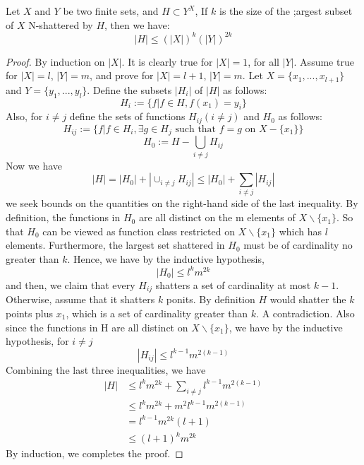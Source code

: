 \begin{lemma}
	Let $X$ and $Y$ be two finite sets, and $H \subset Y^{X}$, If $k$ is the size of the ;argest subset of $X$ N-shattered by $H$, then we have:
	\begin{equation}
	|H| \leq (|X|)^k (|Y|)^{2k}
	\end{equation}
\end{lemma}
\begin{proof}
	By induction on $|X|$.
	It is clearly true for $|X|=1$, for all $|Y|$. Assume true for $|X|=l$, $|Y|= m$, and prove for $|X|=l+1$, $|Y|= m$. Let $X= \{x_1,...,x_{l+1}\}$ and $Y=\{y_1,...,y_l\}$. Define the subsets $|H_i|$ of $|H|$ as follows:
	\begin{equation}
	H_i := \{f| f\in H, f(x_1)=y_i \}
	\end{equation}
	Also, for $i\ne j$ define the sets of functions $H_{ij}(i\ne j)$ and $H_0$ as follows:
	\begin{equation}
	H_{ij} := \{f| f\in H_i, \exists g \in H_j \text{ such that } f=g \text{ on } X-\{x_1\} \}
	\end{equation}
	\begin{equation}
	H_0 := H - \bigcup_{i\ne j} H_{ij}
	\end{equation}
	Now we have
	\begin{equation}
	|H| = |H_0| + |\cup_{i\ne j}H_{ij}| \leq |H_0| + \sum_{i\ne j}|H_{ij}|
	\end{equation}
	we seek bounds on the quantities on the right-hand side of the last inequality. By
	definition, the functions in $H_0$ are all distinct on the m elements of $X \backslash \{x_1\}$. So that $H_0$ can be viewed as function class restricted on $X \backslash \{x_1\}$ which has $l$ elements.
	Furthermore, the largest set shattered in $H_0$ must be of cardinality no greater than
	$k$. Hence, we have by the inductive hypothesis,
	\begin{equation}
	|H_0| \leq l^km^{2k}
	\end{equation}
	and then, we claim that every $H_{ij}$ shatters a set of cardinality at most $k-1$. Otherwise, assume that it shatters $k$ ponits. By definition $H$ would shatter the $k$ points plus $x_1$, which is a set of cardinality greater than $k$. A contradiction. Also  since the functions in H are all distinct on $X \backslash \{x_1\}$, we have by the inductive hypothesis, for $i\ne j$
	\begin{equation}
	|H_{ij}| \leq l^{k-1}m^{2(k-1)}
	\end{equation}
	Combining the last three inequalities, we have
	\begin{align}
	|H| &\leq l^km^{2k} + \sum_{i\ne j}l^{k-1}m^{2(k-1)} \\
	&\leq l^km^{2k} + m^2l^{k-1}m^{2(k-1)} \\ 
	&= l^{k-1}m^{2k}(l+1) \\
	&\leq (l+1)^km^{2k}
	\end{align}
	By induction, we completes the proof.
\end{proof}

